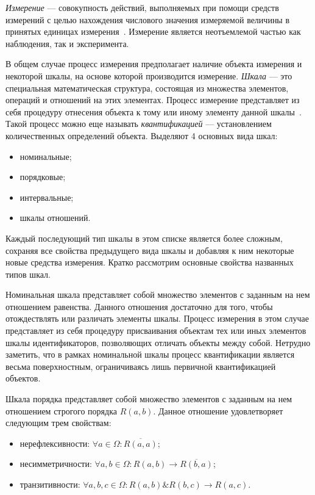 \emph{Измерение} --- совокупность действий, выполняемых при помощи средств измерений
с целью нахождения числового значения измеряемой величины в принятых единицах
измерения~\cite{nekrasov2010}.
Измерение является неотъемлемой частью как наблюдения, так и эксперимента.

В общем случае процесс измерения предполагает наличие объекта измерения и некоторой шкалы,
на основе которой производится измерение.
\textit{Шкала} --- это специальная математическая структура, состоящая из множества элементов,
операций и отношений на этих элементах.
Процесс измерение представляет из себя процедуру отнесения объекта к тому или иному элементу
данной шкалы~\cite{moiseev2004}.
Такой процесс можно еще называть \emph{квантификацией} --- установлением количественных
определений объекта.
Выделяют 4 основных вида шкал:
\begin{itemize}
\item номинальные;
\item порядковые;
\item интервальные;
\item шкалы отношений.
\end{itemize}

Каждый последующий тип шкалы в этом списке является более сложным,
сохраняя все свойства предыдущего вида шкалы и добавляя к ним некоторые новые средства измерения.
Кратко рассмотрим основные свойства названных типов шкал.

Номинальная шкала представляет собой множество элементов с заданным на нем отношением равенства.
Данного отношения достаточно для того, чтобы отождествлять или различать элементы шкалы.
Процесс измерения в этом случае представляет из себя процедуру присваивания объектам тех
или иных элементов шкалы идентификаторов, позволяющих отличать объекты между собой.
Нетрудно заметить, что в рамках номинальной шкалы процесс квантификации является весьма
поверхностным, ограничиваясь лишь первичной квантификацией объектов.

Шкала порядка представляет собой множество элементов с заданным на нем отношением
строгого порядка \( R(a, b) \). Данное отношение удовлетворяет следующим трем свойствам:
\begin{itemize}
\item нерефлексивности:
  \( \forall a \in \Omega: \overline{R(a, a)} \);
\item несимметричности:
  \( \forall a, b \in \Omega: R(a, b) \rightarrow \overline{R(b, a)} \);
\item транзитивности:
  \( \forall a, b, c \in \Omega: R(a, b) \& R(b, c) \rightarrow R(a, c) \).
\end{itemize}

